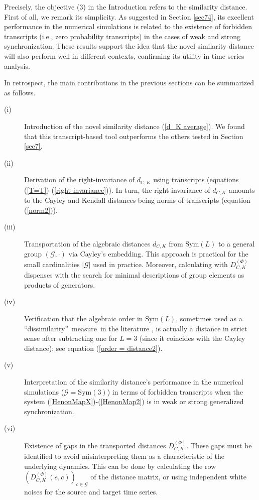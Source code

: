\documentclass[%
 aip,
 amsmath,amssymb,
 reprint,%
]{revtex4-1}
\begin{document}
Precisely, the objective (3) in the Introduction refers to the similarity distance. First of all, we remark its simplicity. As suggested in Section \ref{sec74}, its excellent performance in the numerical
simulations is related to the existence of forbidden transcripts (i.e., zero
probability transcripts) in the cases of weak and strong synchronization. These results support the idea that the novel similarity distance will also perform well in different contexts, confirming its utility in time series analysis. 

In retrospect, the main contributions in the previous sections can be summarized as follows.

\begin{description}

\item[(i)] Introduction of the novel similarity distance (\ref{d_K average}). We found that this transcript-based tool outperforms the others tested in Section \ref{sec7}.

\item[(ii)] Derivation of the right-invariance of $d_{C,K}$ using
transcripts (equations (\ref{T=T})-(\ref{right invariance})). In turn, the
right-invariance of $d_{C,K}$ amounts to the Cayley and Kendall distances
being norms of transcripts (equation (\ref{norm2})).

\item[(iii)] Transportation of the algebraic distances $d_{C,K}$ from $%
\mathrm{Sym}(L)$ to a general group $(\mathcal{G},\cdot )$ via Cayley's
embedding. This approach is practical for the small cardinalities $%
\left\vert \mathcal{G}\right\vert $ used in practice. Moreover, calculating
with $D_{C,K}^{(\Phi )}$ dispenses with the search for minimal descriptions
of group elements as products of generators.

\item[(iv)] Verification that the algebraic order in $\mathrm{Sym}(L)$,
sometimes used as a \textquotedblleft dissimilarity\textquotedblright\
measure\ in the literature \cite{Monetti2009}, is actually a distance in
strict sense after subtracting one for $L=3$ (since it coincides with the
Cayley distance); see equation (\ref{order = distance2}).

\item[(v)] Interpretation of the similarity distance's performance in the
numerical simulations ($\mathcal{G}=\mathrm{Sym}(3)$) in terms of forbidden
transcripts when the system (\ref{HenonMapX})-(\ref{HenonMap2}) is in weak
or strong generalized synchronization.

\item[(vi)] Existence of gaps in the transported distances $D_{C,K}^{(\Phi )}
$. These gaps must be identified to avoid misinterpreting them as a
characteristic of the underlying dynamics. This can be done by calculating
the row $(D_{C,K}^{(\Phi )}(e,c))_{c\in \mathcal{G}}$ of the distance
matrix, or using independent white noises for the source and target time
series.
\end{description}
\end{document}

